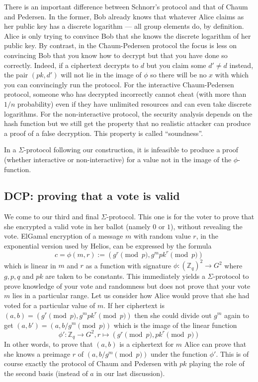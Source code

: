 \documentclass[envcountsame]{llncs}
\begin{document}
There is an important difference between Schnorr's protocol and that of Chaum
and Pedersen. In the former, Bob already knows that whatever Alice claims as her
public key has a discrete logarithm --- all group elements do, by definition.
Alice is only trying to convince Bob that she knows the discrete logarithm of
her public key.
By contrast, in the Chaum-Pedersen protocol the focus is less on convincing Bob
that you know how to decrypt but that you have done so correctly. Indeed, if a
ciphertext decrypts to $d$ but you claim some $d' \neq d$ instead, the pair
$(pk, d')$ will not lie in the image of $\phi$ so there will be no $x$ with
which you can convincingly run the protocol. For the interactive Chaum-Pedersen
protocol, someone who has decrypted incorrectly cannot cheat (with more than
$1/n$ probability) even if they have unlimited resources and can even take
discrete logarithms. For the non-interactive protocol, the security analysis
depends on the hash function but we still get the property that no realistic
attacker can produce a proof of a false decryption. This property is called
``soundness''.

\begin{proposition}
In a $\Sigma$-protocol following our construction, it is infeasible to produce a
proof (whether interactive or non-interactive) for a value not in the image of
the $\phi$-function.
\end{proposition}

\subsection{DCP: proving that a vote is valid}

We come to our third and final $\Sigma$-protocol. This one is for the voter to
prove that she encrypted a valid vote in her ballot (namely $0$ or $1$), without
revealing the vote. ElGamal encryption of a message $m$ with random value $r$,
in the exponential version used by Helios, can be expressed by the formula
\[
c = \phi(m, r) := (g^r \pmod{p}, g^m pk^r \pmod{p})
\]
which is linear in $m$ and $r$ as a function with signature
$\phi: (\mathbb Z_q)^2 \to G^2$
where $g, p, q$ and $pk$ are taken to be constants.
This immediately yields a $\Sigma$-protocol to prove knowledge of your vote and
randomness but does not prove that your vote $m$ lies in a particular range.
Let us consider how Alice would prove that she had voted for a particular value
of $m$. If her ciphertext is $(a, b) = (g^r \pmod{p}, g^m pk^r \pmod{p})$ then
she could divide out $g^m$ again to get $(a, b') = (a, b/g^m \pmod{p})$ which
is the image of the linear function
\[
\phi': \mathbb Z_q \to G^2, r \mapsto (g^r \pmod{p}, pk^r \pmod{p})
\]
In other words, to prove that $(a, b)$ is a ciphertext for $m$ Alice can prove
that she knows a preimage $r$ of $(a, b/g^m \pmod{p})$ under the function
$\phi'$. This is of course exactly the protocol of Chaum and Pedersen with $pk$
playing the role of the second basis (instead of $a$ in our last discussion).
\end{document}
